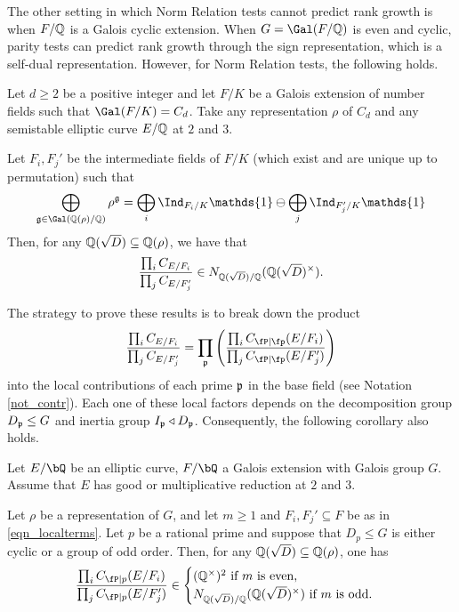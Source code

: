 
The other setting in which Norm Relation tests cannot predict rank growth is when $F/\mathbb{Q}$ is a Galois cyclic extension. When $G=\Gal(F/\QQ)$ is even and cyclic, parity tests can predict rank growth through the sign representation, which is a self-dual representation. However, for Norm Relation tests, the following holds.

\begin{thm}\label{thm_cyclic-cons}
    Let $d\geq2$ be a positive integer and let $F/K$ be a Galois extension of number fields such that $\Gal(F/K)=C_d$. Take any representation $\rho$ of $C_d$ and any semistable elliptic curve $E/\mathbb{Q}$ at $2$ and $3$. 
    
    Let $F_i,F_j'$ be the intermediate fields of $F/K$ (which exist and are unique up to permutation) such that 
    \begin{equation*}%
        \bigoplus_{\mathfrak{g}\in\Gal(\QQ(\rho)/\QQ)}\rho^{\mathfrak{g}}=\bigoplus_i\Ind_{F_i/K}\mathds{1}\ominus\bigoplus_j\Ind_{F'_j/K}\mathds{1}
    \end{equation*}
    Then, for any $\mathbb{Q}(\sqrt{D})\subseteq\mathbb{Q}(\rho)$, we have that
    $$\frac{\prod_i C_{E/F_i}}{\prod_j C_{E/F_j'}}\in N_{\mathbb{Q}(\sqrt{D})/\mathbb{Q}}(\mathbb{Q}(\sqrt{D})^{\times}).$$
\end{thm}

The strategy to prove these results is to break down the product 
$$\frac{\prod_i C_{E/F_i}}{\prod_j C_{E/F_j'}}=\prod_{\pp}\left(\frac{\prod_i \Cp(E/F_i)}{\prod_j \Cp(E/F_j')}\right)$$
into the local contributions of each prime $\mathfrak{p}$ in the base field (see Notation \ref{not_contr}). Each one of these local factors depends on the decomposition group $D_{\mathfrak{p}}\leq G$ and inertia group $I_{\mathfrak{p}}\triangleleft D_{\mathfrak{p}}$. Consequently, the following corollary also holds.

\begin{cor}%
    Let $E / \bQ$ be an elliptic curve, $F / \bQ$ a Galois extension with Galois group $G$. Assume that $E$ has good or multiplicative reduction at $2$ and $3$. 
    
    Let $\rho$ be a representation of $G$, and let $m\geq 1$ and $F_i,F_j'\subseteq F$ be as in \eqref{eqn_localterms}. Let $p$ be a rational prime and suppose that $D_p\leq G$ is either cyclic or a group of odd order. Then, for any $\mathbb{Q}(\sqrt{D})\subseteq\mathbb{Q}(\rho)$, one has
    \[
        \frac{\prod_i C_{\fP\mid p}(E/F_i)}{\prod_j C_{\fP\mid p}(E/F_j')}\in
        \begin{cases}
            \QQss \text{ if $m$ is even,}\\
            N_{\QQ(\sqrt{D})/\QQ}(\QQ(\sqrt{D})^{\times}) \text{ if $m$ is odd.}
        \end{cases}
    \] 
\end{cor}

